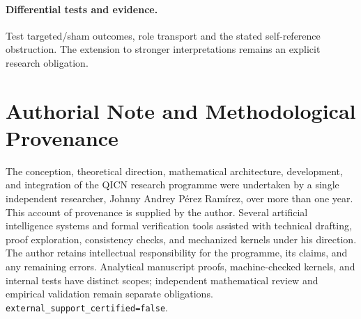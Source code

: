 \documentclass[11pt,a4paper]{article}
\theoremstyle{definition}
\begin{document}
\paragraph{Differential tests and evidence.} Test targeted/sham outcomes, role transport and the stated self-reference obstruction. The extension to stronger interpretations remains an explicit research obligation.



\printbibliography

\section*{Authorial Note and Methodological Provenance}
The conception, theoretical direction, mathematical architecture, development,
and integration of the QICN research programme were undertaken by a single
independent researcher, Johnny Andrey P\'erez Ram\'irez, over more than one year.
This account of provenance is supplied by the author. Several artificial
intelligence systems and formal verification tools assisted with technical
drafting, proof exploration, consistency checks, and mechanized kernels under
his direction. The author retains intellectual responsibility for the
programme, its claims, and any remaining errors. Analytical manuscript proofs,
machine-checked kernels, and internal tests have distinct scopes; independent
mathematical review and empirical validation remain separate obligations.
\texttt{external\_support\_certified=false}.
\end{document}

